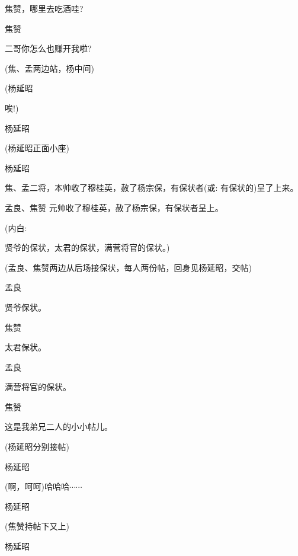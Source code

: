 {焦赞，哪里去吃酒哇?

焦赞\hspace{30pt}~

二哥你怎么也赚开我啦?

(焦、孟两边站，杨中间)

(杨延昭\hspace{20pt}~

唉!)

杨延昭


(杨延昭正面小座)

杨延昭

焦、孟二将，本帅收了穆桂英，赦了杨宗保，有保状者({\akai 或}: 有保状的)呈了上来。

孟良、焦赞 元帅收了穆桂英，赦了杨宗保，有保状者呈上。

({\akai 内}白:\hspace{30pt}~

贤爷的保状，太君的保状，满营将官的保状。)

(孟良、焦赞两边从后场接保状，每人两份帖，回身见杨延昭，交帖)

孟良\hspace{30pt}~

贤爷保状。

焦赞\hspace{30pt}~

太君保状。

孟良\hspace{30pt}~

满营将官的保状。

焦赞\hspace{30pt}~

这是我弟兄二人的小小帖儿。

(杨延昭分别接帖)

杨延昭\hspace{20pt}~

(啊，呵呵)哈哈哈$\cdots{}\cdots{}$

杨延昭\hspace{20pt}~


(焦赞持帖下又上)

杨延昭


}
